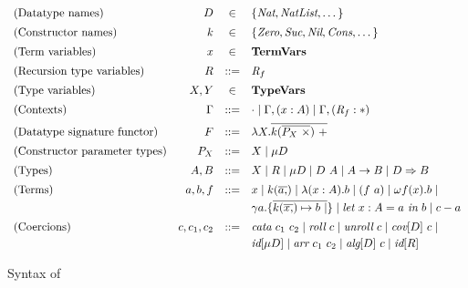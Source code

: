 \documentclass[runningheads]{llncs}
\begin{document}
\begin{figure}[tb]
  \centering

  \begin{align*}
    \begin{array}{lrcl}
      \text{(Datatype names)} &
      D &\in& \{ \textit{Nat}, \textit{NatList}, \dots \}
      \\[0.5em]
      \text{(Constructor names)} &
      k &\in& \{ \textit{Zero}, \textit{Suc}, \textit{Nil}, \textit{Cons}, \dots \}
      \\[0.5em]
      \text{(Term variables)} &
      x &\in& \textbf{TermVars}
      \\[0.5em]
      \text{(Recursion type variables)} &
      R &::=& \textit{R}_{f}
      \\[0.5em]
      \text{(Type variables)} &
      X, Y &\in& \textbf{TypeVars}
      \\[0.5em]
      \text{(Contexts)} &
      \Gamma
      &::=&
      \cdot \mid
      \Gamma , (x : A) \mid
      \Gamma , (\textit{R}_{f} : \ast)
      \\[0.5em]
      \text{(Datatype signature functor)} &
      F &::=& \lambda X . \overline{k(\overline{P_X ~\times}) ~+}
      \\[0.5em]
      \text{(Constructor parameter types)} &
      P_X &::=&
      X \mid
      \mu D
      \\[0.5em]
      \text{(Types)} &
      A, B
      & ::= &
      X \mid
      R \mid
      \mu D \mid
      D ~ A \mid
      A \to B \mid
      D \Rightarrow B
      \\[0.5em]
      \text{(Terms)} &
      a, b, f
      & ::= &
      x \mid
      k(\overline{a ,}) \mid
      \lambda (x : A) . b \mid
      (f ~ a) \mid
      \omega f(x) . b \mid
      \\[0.25em] &&&
      \gamma a . \{ \overline{k(\overline{x ,}) \mapsto b ~|} \} \mid
      \textit{let}~ x : A = a ~\textit{in}~ b \mid
      c - a
      \\[0.5em]
      \text{(Coercions)} &
      c, c_1, c_2
      & ::= &
      \textit{cata}~ c_1 ~ c_2 \mid
      \textit{roll}~ c \mid
      \textit{unroll}~ c \mid
      \textit{cov}[D] ~ c \mid
      \\[0.25em] &&&
      \textit{id}[\mu D] \mid
      \textit{arr}~ c_1 ~ c_2 \mid
      \textit{alg}[D] ~ c \mid
      \textit{id}[R]
    \end{array}
  \end{align*}
\caption{Syntax of \lcata}
\label{fig:syntax}
\end{figure}
\end{document}
